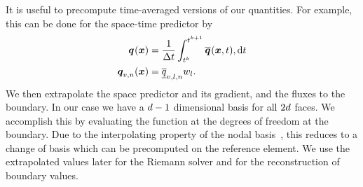 It is useful to precompute time-averaged versions of our quantities.
For example, this can be done for the space-time predictor by
\begin{align}\label{eq:time-average}
  \begin{split}
  \spredictor (\bm{x}) &= \frac{1}{\Delta t} \intdt{
\stpredictor(\bm{x}, t),
  } \\
\spredictor[][v,n] (\bm{x}) &= \stpredictorCoeff[][v,l,n] \quadWeight[l].
  \end{split}
\end{align}
We then extrapolate the space predictor and its gradient, and the fluxes to the boundary.
In our case we have a $d - 1$ dimensional basis for all $2 d$ faces.
We accomplish this by evaluating the function at the degrees of freedom at the boundary.
Due to the interpolating property of the nodal basis~, this reduces to a change of basis which can be precomputed on the reference element.
We use the extrapolated values later for the Riemann solver and for the reconstruction of boundary values.


